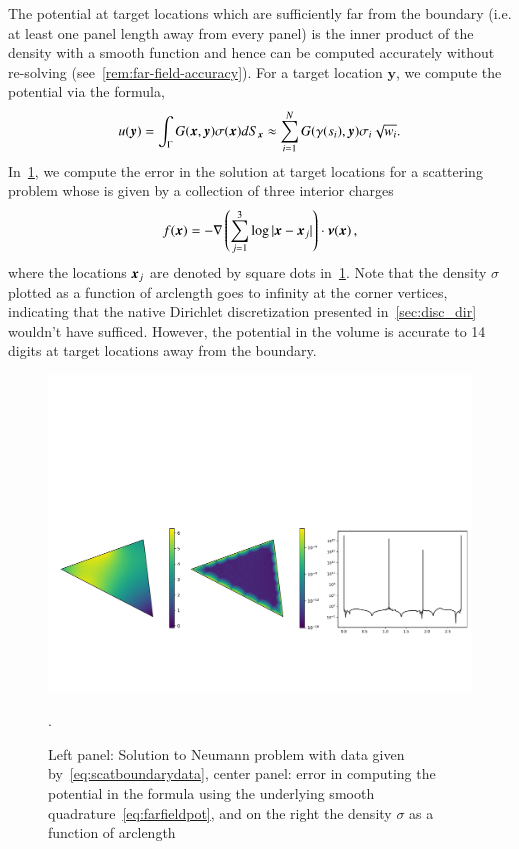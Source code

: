 The potential at target locations which are sufficiently far from the boundary (i.e. at least one panel length away from 
every panel) is the inner product of the 
density with a smooth function and hence can be computed accurately without re-solving (see~\cref{rem:far-field-accuracy}). For a target 
location $\boldsymbol{y}$, we compute the potential via the formula,
\begin{equation}
\label{eq:farfieldpot}
u(\boldsymbol{y}) = \int_{\Gamma} G(\boldsymbol{x},\boldsymbol{y}) \sigma(\boldsymbol{x}) dS_{\boldsymbol{x}} \approx \sum_{i=1}^{N}  G(\gamma(s_{i}),\boldsymbol{y}) \sigma_{i} \sqrt{w_{i}}.
\end{equation}
In~\cref{fig:scatteringtest}, we compute the error in the solution at target
locations for a scattering problem whose  is given by a collection of three interior charges
\begin{equation}
\label{eq:scatboundarydata}
f(\boldsymbol{x}) = -\nabla  \left(\sum_{j=1}^{3} \log |\boldsymbol{x} - \boldsymbol{x}_{j}|  \right)  \cdot \boldsymbol{\nu}(\boldsymbol{x})\, ,  
\end{equation}
where the locations $\boldsymbol{x}_{j}$ are denoted by square dots in~\cref{fig:scatteringtest}. Note that the density $\sigma$ plotted
as a function of arclength goes to infinity at the corner vertices, indicating that the native Dirichlet discretization 
presented in~\cref{sec:disc_dir} wouldn't have sufficed. However, the potential in the volume is accurate to 14 digits at
target locations away from the boundary. 
\begin{figure}
\begin{center}
\includegraphics[width=\linewidth]{paper-figs/weaktest}
\caption{Left panel: Solution to Neumann problem with data given by~\cref{eq:scatboundarydata}, center panel: error in computing the potential in the formula using the underlying smooth quadrature~\cref{eq:farfieldpot}, and on the right the density $\sigma$ as a function of arclength}.
\label{fig:scatteringtest}
\end{center}
\end{figure}


